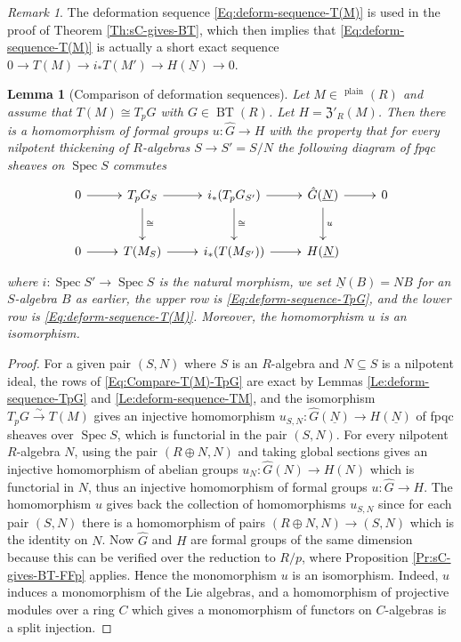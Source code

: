 \documentclass[a4paper,11pt]{amsart}
\theoremstyle{plain}
\newtheorem{Lemma}[equation]{Lemma}
\theoremstyle{definition}
\theoremstyle{remark}
\newtheorem{Remark}[equation]{Remark}
\newcommand{\bLe}{\begin{Lemma}}
\newcommand{\eLe}{\end{Lemma}}
\newcommand{\bRe}{\begin{Remark}}
\newcommand{\eRe}{\end{Remark}}
\newcommand{\bproof}{\begin{proof}}
\newcommand{\eproof}{\end{proof}}
\newcommand{\beqn}{\begin{equation}}
\newcommand{\eeqn}{\end{equation}}
\renewcommand{\u}{\underline}
\newcommand{\uM}{M} %
\numberwithin{equation}{section}
\newcommand{\FZ}{\mathfrak{Z}}
\DeclareMathOperator{\plain}{plain}
\DeclareMathOperator{\BT}{BT}
\DeclareMathOperator{\sDisp}{{}^sDisp}
\DeclareMathOperator{\Spec}{Spec}
\begin{document}
\bRe
The deformation sequence \eqref{Eq:deform-sequence-T(M)} is used in the proof of Theorem \ref{Th:sC-gives-BT}, which then implies that \eqref{Eq:deform-sequence-T(M)} is actually a short exact sequence $0\to T(\uM)\to i_*T(\uM')\to H(\u N)\to 0$. 
\eRe

\bLe
[Comparison of deformation sequences]
\label{Le:Compare-T(M)-TpG}
Let $\uM\in\sDisp^{\plain}(R)$ and assume that $T(\uM)\cong T_pG$ with $G\in\BT(R)$.  Let $H=\FZ'_R(\uM)$. 
Then there is a homomorphism of formal groups $u\colon \hat G\to H$ with the property that for every nilpotent thickening of $R$-algebras $S\to S'=S/N$ the following diagram of fpqc sheaves on $\Spec S$ commutes 
\beqn
\label{Eq:Compare-T(M)-TpG}
\xymatrix@M+0.2em{
0 \ar[r] & T_pG_S \ar[r] \ar[d]^\cong & i_*(T_pG_{S'}) \ar[r] \ar[d]^\cong & \hat G(\u N) \ar[r] \ar[d]^u & 0 \\
0 \ar[r] & T(\uM_S) \ar[r] & i_*(T(\uM_{S'})) \ar[r] & H(\u N) 
}
\eeqn
where $i\colon \Spec S'\to\Spec S$ is the natural morphism, we set $\u N(B)=NB$ for an $S$-algebra $B$ as earlier, 
the upper row is \eqref{Eq:deform-sequence-TpG}, and the lower row is \eqref{Eq:deform-sequence-T(M)}.
Moreover, the homomorphism $u$ is an isomorphism.
\eLe

\bproof
For a given pair $(S,N)$ where $S$ is an $R$-algebra and $N\subseteq S$ is a nilpotent ideal, the 
rows of \eqref{Eq:Compare-T(M)-TpG} are exact by 
Lemmas \ref{Le:deform-sequence-TpG} and \ref{Le:deform-sequence-TM}, 
and the isomorphism $T_pG\xrightarrow\sim T(\uM)$ gives an injective homomorphism $u_{S,N}\colon \hat G(\u N)\to H(\u N)$ of fpqc sheaves over $\Spec S$, which is functorial in the pair $(S,N)$. For every nilpotent $R$-algebra $N$, using the pair $(R\oplus N,N)$ and taking global sections gives an injective homomorphism of abelian groups $u_N\colon \hat G(N)\to H(N)$ which is functorial in $N$, thus an injective homomorphism of formal groups $u\colon \hat G\to H$. The homomorphism $u$ gives back the collection of homomorphisms $u_{S,N}$ since for each pair $(S,N)$ there is a homomorphism of pairs $(R\oplus N,N)\to(S,N)$ which is the identity on $N$.
Now $\hat G$ and $H$ are formal groups of the same dimension because this can be verified over the reduction to $R/p$, 
where Proposition \ref{Pr:sC-gives-BT-FFp} applies.
Hence the monomorphism $u$ is an isomorphism. Indeed, $u$ induces a monomorphism of the Lie algebras, and a homomorphism of projective modules over a ring $C$ which gives a monomorphism of functors on $C$-algebras is a split injection.
\eproof
\end{document}
